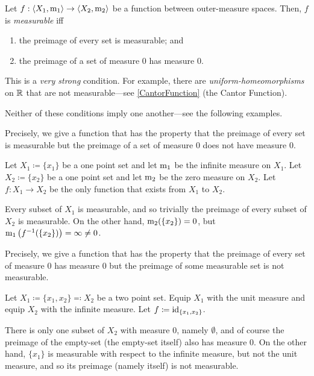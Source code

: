 \begin{dfn}\label{MeasurableFunction}
Let $f:\langle X_1,\mathrm{m} _1\rangle\rightarrow \langle X_2,\mathrm{m} _2\rangle$ be a function between outer-measure spaces.  Then, $f$ is \emph{measurable} iff
\begin{enumerate}
\item \label{MeasurableFunction.i}the preimage of every set is measurable; and
\item \label{MeasurableFunction.ii}the preimage of a set of measure $0$ has measure $0$.
\end{enumerate}
\begin{rmk}
This is a \emph{very strong} condition.  For example, there are \emph{uniform-homeomorphisms} on $\mathbb{R}$ that are not measurable---see \cref{CantorFunction} (the Cantor Function).
\end{rmk}
\begin{rmk}
Neither of these conditions imply one another---see the following examples.
\end{rmk}
\end{dfn}
\begin{exm}
Precisely, we give a function that has the property that the preimage of every set is measurable but the preimage of a set of measure $0$ does not have measure $0$.

Let $X_1\coloneqq \{ x_1\}$ be a one point set and let $\mathrm{m} _1$ be the infinite measure on $X_1$.  Let $X_2\coloneqq \{ x_2\}$ be a one point set and let $\mathrm{m} _2$ be the zero measure on $X_2$.  Let $f:X_1\rightarrow X_2$ be the only function that exists from $X_1$ to $X_2$.

Every subset of $X_1$ is measurable, and so trivially the preimage of every subset of $X_2$ is measurable.  On the other hand, $\mathrm{m} _2(\{ x_2\} )=0$, but $\mathrm{m} _1\left( f^{-1}(\{ x_2\} )\right) =\infty \neq 0$.
\end{exm}
\begin{exm}
Precisely, we give a function that has the property that the preimage of every set of measure $0$ has measure $0$ but the preimage of some measurable set is not measurable.

Let $X_1\coloneqq \{ x_1,x_2\} \eqqcolon X_2$ be a two point set.  Equip $X_1$ with the unit measure and equip $X_2$ with the infinite measure.  Let $f\coloneqq \operatorname{id} _{\{ x_1,x_2\}}$.

There is only one subset of $X_2$ with measure $0$, namely $\emptyset$, and of course the preimage of the empty-set (the empty-set itself) also has measure $0$.  On the other hand, $\{ x_1\}$ is measurable with respect to the infinite measure, but not the unit measure, and so its preimage (namely itself) is not measurable.
\end{exm}

